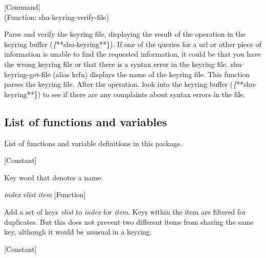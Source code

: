 \vspace{1em}
\noindent
{}
\usebox{\funcname}
 \hfill [Command]\\%
 (Function: shu-keyring-verify-file)

\begin{doc-string}
Parse and verify the keyring file, displaying the result of the operation in the
keyring buffer (\emph\{**shu-keyring**\}).  If one of the queries for a url or other
piece of information is unable to find the requested information, it could be
that you have the wrong keyring file or that there is a syntax error in the
keyring file.  shu-keyring-get-file (alias krfn) displays the name of the
keyring file.  This function parses the keyring file.  After the operation. look
into the keyring buffer (\emph\{**shu-keyring**\}) to see if there are any complaints
about syntax errors in the file.
\end{doc-string}

\subsection{List of functions and variables}

List of functions and variable definitions in this package.



\vspace{1em}
\noindent
{}
\usebox{\funcname}
 \hfill [Constant]

\begin{doc-string}
Key word that denotes a name.
\end{doc-string}

\vspace{1em}
\noindent
{}
\usebox{\funcname}\emph{index} \emph{vlist} \emph{item}
 \hfill [Function]

\begin{doc-string}
Add a set of keys \emph{vlist} to \emph{index} for \emph{item}.  Keys within the item are filtered for
duplicates.  But this does not prevent two different items from sharing the same key,
although it would be unusual in a keyring.
\end{doc-string}

\vspace{1em}
\noindent
{}
\usebox{\funcname}
 \hfill [Constant]

